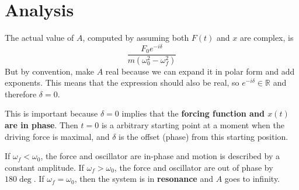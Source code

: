\documentclass[11pt]{article}
\begin{document}
\section{Analysis}
	The actual value of $A$, computed by assuming both $F(t)$ and $x$ are complex, is 
	\[\frac{F_0 e^{-i\delta}}{m(\omega_0^2 - \omega_f^2)}\]
	But by convention, make $A$ real because we can expand it in polar form and add exponents. This means that the expression should also be real, so $e^{-i\delta} \in \mathbb{R}$ and therefore $\delta = 0$. 
	
	This is important because $\delta = 0$ implies that the \textbf{forcing function and $x(t)$ are in phase}. Then $t=0$ is a arbitrary starting point at a moment when the driving force is maximal, and $\delta$ is the offset (phase) from this starting position.
	
	If $\omega_f < \omega_0$, the force and oscillator are in-phase and motion is described by a constant amplitude. If $\omega_f > \omega_0$, the force and oscillator are out of phase by $180\deg$. If $\omega_f = \omega_0$, then the system is in \textbf{resonance} and $A$ goes to infinity.
%		
%		


\end{document}
